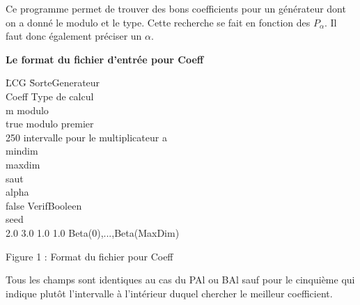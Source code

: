 
\baselineskip=14pt
Ce programme permet de trouver des bons coefficients pour un
g\'en\'erateur dont on a donn\'e le modulo et le type. Cette
recherche se fait en fonction des $P_\alpha$. Il faut donc 
\'egalement pr\'eciser un $\alpha$. 

\noindent
{\bf Le format du fichier d'entr\'ee pour Coeff}

\begin{center}
\it{
\begin{tabbing}
\hspace{2cm}\= LCG \hspace{3cm} \= SorteGenerateur \\
\>Coeff \>   Type de calcul \\
     \>      m  modulo\\
\>true    \>      modulo premier\\  
 250   \>      intervalle pour le multiplicateur a\\
       \>      mindim\\
      \>      maxdim\\
      \>      saut \\ 
       \>      alpha\\
\>false   \>      VerifBooleen\\
       \>      seed\\
 2.0 3.0 1.0 1.0 \> Beta(0),...,Beta(MaxDim)\\
\end{tabbing}
}
\rm {Figure 1 : Format du fichier pour Coeff}
\end{center}

\noindent
Tous les champs sont identiques au cas du PAl ou BAl sauf pour le
cinqui\`eme qui indique plut\^ot l'intervalle \`a l'int\'erieur 
duquel chercher le meilleur coefficient.

